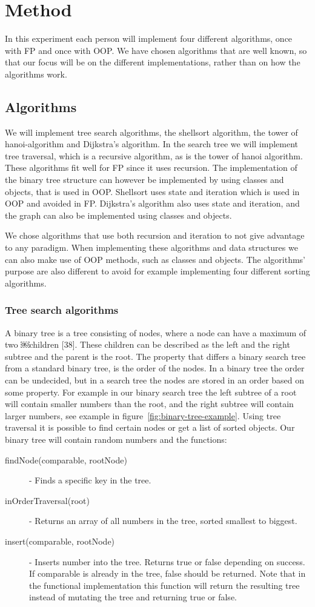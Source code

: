 \documentclass {article}
\begin{document}
\section{Method}
In this experiment each person will implement four different algorithms, once with FP and once with OOP. We have chosen algorithms that are well known, so that our focus will be on the different implementations, rather than on how the algorithms work. 
\subsection{Algorithms}
We will implement tree search algorithms, the shellsort algorithm, the tower of hanoi-algorithm and Dijkstra's algorithm. In the search tree we will implement tree traversal, which is a recursive algorithm, as is the tower of hanoi algorithm. These algorithms fit well for FP since it uses recursion. The implementation of the binary tree structure can however be implemented by using classes and objects, that is used in OOP. Shellsort uses state and iteration which is used in OOP and avoided in FP. Dijkstra's algorithm also uses state and iteration, and the graph can also be implemented using classes and objects.

We chose algorithms that use both recursion and iteration to not give advantage to any paradigm. When implementing these algorithms and data structures we can also make use of OOP methods, such as classes and objects. The algorithms' purpose are also different to avoid for example implementing four different sorting algorithms. 
\subsubsection{Tree search algorithms}
A binary tree is a tree consisting of nodes, where a node can have a maximum of two ￼children [38]. These children can be described as the left and the right subtree and the parent is the root. The property that differs a binary search tree from a standard binary tree, is the order of the nodes. In a binary tree the order can be undecided, but in a search tree the nodes are stored in an order based on some property. For example in our binary search tree the left subtree of a root will contain smaller numbers than the root, and the right subtree will contain larger numbers, see example in figure~\ref{fig:binary-tree-example}. Using tree traversal it is possible to find certain nodes or get a list of sorted objects. Our binary tree will contain random numbers and the functions:
\begin{description}
\item [findNode(comparable, rootNode)] - Finds a specific key in the tree.
\item [inOrderTraversal(root)] - Returns an array of all numbers in the tree, sorted smallest to biggest.
\item [insert(comparable, rootNode)] - Inserts number into the tree. Returns true or false depending on success. If comparable is already in the tree, false should be returned. Note that in the functional implementation this function will return the resulting tree instead of mutating the tree and returning true or false.
\end{description}
\end{document}
